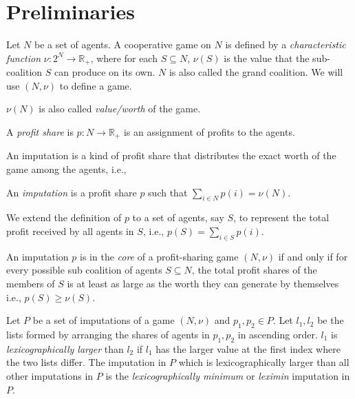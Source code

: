 
\section{Preliminaries}


\begin{definition}
    Let $N$ be a set of agents. A cooperative game on $N$ is defined by a {\em characteristic function} $\nu: 2^N \rightarrow \mathbb{R}_+$, where for each $S \subseteq N$, $\nu(S)$ is the value that the sub-coalition $S$ can produce on its own. $N$ is also called the grand coalition. We will use $(N,\nu)$ to define a game.
\end{definition}

$\nu(N)$ is also called \textit{value/worth} of the game.  


\begin{definition}
    A \textit{profit share} is $p: N \to \mathbb{R}_+$ is an assignment of profits to the agents.
\end{definition}
An imputation is a kind of profit share that distributes the exact worth of the game among the agents, i.e.,
\begin{definition}
An \textit{imputation} is a profit share $p$ such that $\sum_{i \in N} p(i)=\nu(N)$.
\end{definition}

We extend the definition of $p$ to a set of agents, say $S$, to represent the total profit received by all agents in $S$, i.e., $p(S)=\sum_{i\in S}p(i)$.

\begin{definition}\label{defCore}
An imputation $p$ is in the {\em core} of a profit-sharing game $(N,\nu)$ if and only if for every possible sub coalition of agents $S \subseteq N$, the total profit shares of the members of $S$ is at least as large as the worth they can generate by themselves i.e., $ p(S) \geq \nu(S)$.
\end{definition}


\begin{definition}
Let $P$ be a set of imputations of a game $(N,\nu)$ and $p_1,p_2 \in P$. Let $l_1,l_2$ be the lists formed by arranging the shares of agents in $p_1,p_2$ in ascending order. $l_1$ is {\em lexicographically larger} than $l_2$ if $l_1$ has the larger value at the first index where the two lists differ. The imputation in $P$ which is lexicographically larger than all other imputations in $P$ is the {\em lexicographically minimum} or {\em leximin} imputation in $P$.  
\end{definition}


